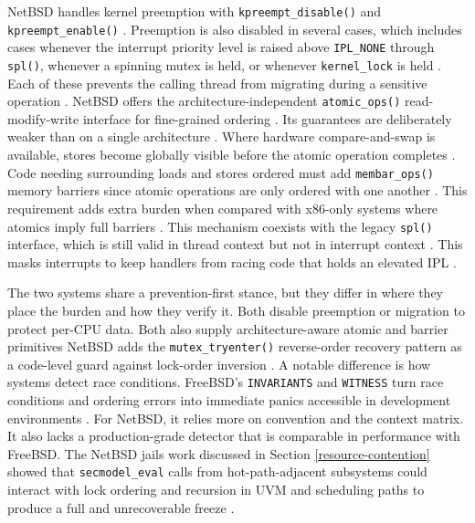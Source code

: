 NetBSD handles kernel preemption with \texttt{kpreempt\_disable()} and \texttt{kpreempt\_enable()}
\parencite{netbsd_kpreempt}. Preemption is also disabled in several cases, which includes cases whenever the interrupt priority
level is raised above \texttt{IPL\_NONE} through \texttt{spl()}, whenever a spinning mutex is held, or whenever \texttt{kernel\_lock}
is held \parencite{netbsd_kpreempt}. Each of these prevents the calling thread from migrating during a sensitive operation
\parencite{netbsd_kpreempt}. NetBSD offers the architecture-independent \texttt{atomic\_ops()} read-modify-write interface for
fine-grained ordering \parencite{netbsd_atomic_ops}. Its guarantees are deliberately weaker than on a single architecture
\parencite{netbsd_atomic_ops}. Where hardware compare-and-swap is available, stores become globally visible before the atomic
operation completes \parencite{netbsd_atomic_ops}. Code needing surrounding loads and stores ordered must add \texttt{membar\_ops()}
memory barriers since atomic operations are only ordered with one another \parencite{netbsd_atomic_ops}. This requirement adds
extra burden when compared with x86-only systems where atomics imply full barriers \parencite{netbsd_atomic_ops}.
This mechanism coexists with the legacy \texttt{spl()} interface, which is  still valid in thread context but not in interrupt
context \parencite{netbsd_locking}. This masks interrupts to keep handlers from racing code that holds an elevated IPL
\parencite{netbsd_locking}.

The two systems share a prevention-first stance, but they differ in where they place the burden and how they verify it.
Both disable preemption or migration to protect per-CPU data. Both also supply architecture-aware atomic and barrier primitives
NetBSD adds the \texttt{mutex\_tryenter()} reverse-order recovery pattern as a code-level guard
against lock-order inversion \parencite{netbsd_mutex}. A notable difference is how systems detect race conditions.
FreeBSD's \texttt{INVARIANTS} and \texttt{WITNESS} turn race conditions and ordering errors into immediate panics
accessible in development environments \parencite{freebsd_debugging}. For NetBSD, it relies more on convention and the
context matrix. It also lacks a production-grade detector that is comparable in performance with FreeBSD. The NetBSD jails work
discussed in Section \ref{resource-contention} showed that \texttt{secmodel\_eval} calls from hot-path-adjacent subsystems
could interact with lock ordering and recursion in UVM and scheduling paths to produce a full and unrecoverable freeze
\parencite{petermann_jails}.

